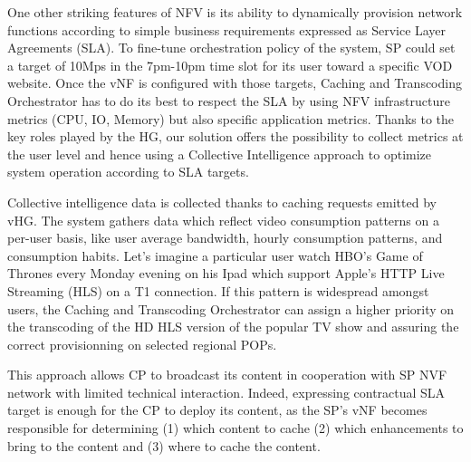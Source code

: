 One other striking features of NFV is its ability to dynamically provision network functions according to simple business requirements expressed as Service Layer Agreements (SLA).
To fine-tune orchestration policy of the system, SP could set a target of 10Mps in the 7pm-10pm time slot for its user toward a specific VOD website.
Once the vNF is configured with those targets, Caching and Transcoding Orchestrator has to do its best to respect the SLA by using NFV infrastructure metrics (CPU, IO, Memory) but also specific application metrics.
Thanks to the key roles played by the HG, our solution offers the possibility to collect metrics at the user level and hence using a Collective Intelligence approach to optimize system operation according to SLA targets. 

Collective intelligence data is collected thanks to caching requests emitted by vHG.
The system gathers data which reflect video consumption patterns on a per-user basis, like user average bandwidth, hourly consumption patterns, and consumption habits.
Let's imagine a particular user watch HBO's Game of Thrones every Monday evening on his Ipad which support Apple's HTTP Live Streaming (HLS) on a T1 connection.
If this pattern is widespread amongst users, the Caching and Transcoding Orchestrator can assign a higher priority on the transcoding of the HD HLS version of the popular TV show and assuring the correct provisionning on selected regional POPs.

This approach allows CP to broadcast its content in cooperation with SP NVF network with limited technical interaction.
Indeed, expressing contractual SLA target is enough for the CP to deploy its content, as the SP's vNF becomes responsible for determining (1) which content to cache (2) which enhancements to bring to the content and (3) where to cache the content.


